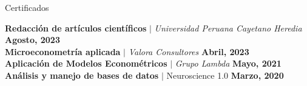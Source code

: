 \documentclass{resume} %
\begin{document}
\begin{rSection}{Certificados}

{\bf Redacción de artículos científicos} $|$ {\it Universidad Peruana Cayetano Heredia} \hfill {\bf Agosto, 2023} \\

{\bf Microeconometría aplicada} $|$ {\it Valora Consultores} \hfill {\bf Abril, 2023} \\


{\bf Aplicación de Modelos Econométricos} $|$ {\it Grupo Lambda} \hfill {\bf Mayo, 2021} \\



{\bf Análisis y manejo de bases de datos} $|$ Neuroscience 1.0 \hfill {\bf Marzo, 2020} \\





\end{rSection}
\end{document}
